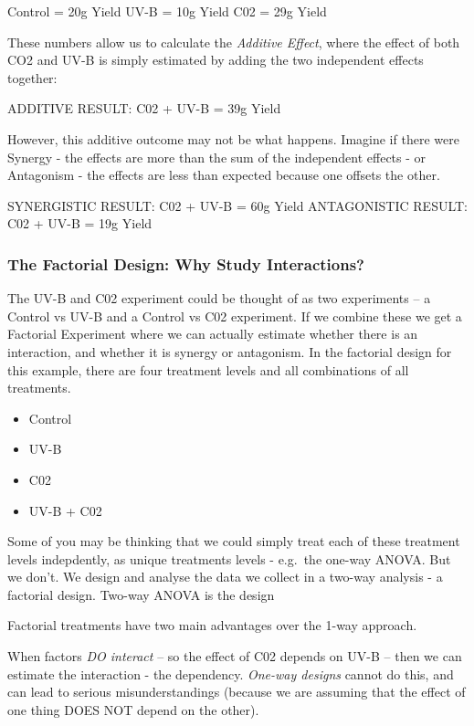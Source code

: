 \documentclass[
]{book}
\providecommand{\tightlist}{%
  \setlength{\itemsep}{0pt}\setlength{\parskip}{0pt}}
\begin{document}
Control = 20g Yield
UV-B = 10g Yield
C02 = 29g Yield

These numbers allow us to calculate the \emph{Additive Effect}, where the effect of both CO2 and UV-B is simply estimated by adding the two independent effects together:

ADDITIVE RESULT: C02 + UV-B = 39g Yield

However, this additive outcome may not be what happens. Imagine if there were Synergy - the effects are more than the sum of the independent effects - or Antagonism - the effects are less than expected because one offsets the other.

SYNERGISTIC RESULT: C02 + UV-B = 60g Yield
ANTAGONISTIC RESULT: C02 + UV-B = 19g Yield

\subsubsection{The Factorial Design: Why Study Interactions?}\label{the-factorial-design-why-study-interactions}

The UV-B and C02 experiment could be thought of as two experiments -- a Control vs UV-B and a Control vs C02 experiment. If we combine these we get a Factorial Experiment where we can actually estimate whether there is an interaction, and whether it is synergy or antagonism. In the factorial design for this example, there are four treatment levels and all combinations of all treatments.

\begin{itemize}
\tightlist
\item
  Control
\item
  UV-B
\item
  C02
\item
  UV-B + C02
\end{itemize}

Some of you may be thinking that we could simply treat each of these treatment levels indepdently, as unique treatments levels - e.g.~the one-way ANOVA. But we don't. We design and analyse the data we collect in a two-way analysis - a factorial design. Two-way ANOVA is the design

Factorial treatments have two main advantages over the 1-way approach.

When factors \emph{DO interact} -- so the effect of C02 depends on UV-B -- then we can estimate the interaction - the dependency. \emph{One-way designs} cannot do this, and can lead to serious misunderstandings (because we are assuming that the effect of one thing DOES NOT depend on the other).
\end{document}
